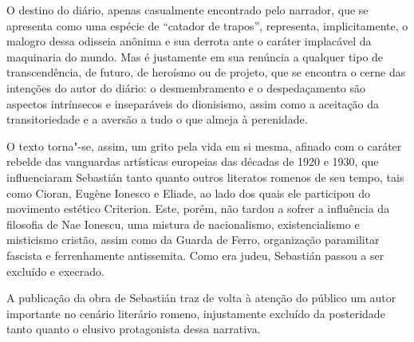 O destino do diário, apenas casualmente encontrado pelo narrador, que se
apresenta como uma espécie de ``catador de trapos'', representa,
implicitamente, o malogro dessa odisseia anônima e sua derrota ante o
caráter implacável da maquinaria do mundo. Mas é justamente em sua
renúncia a qualquer tipo de transcendência, de futuro, de heroísmo ou de
projeto, que se encontra o cerne das intenções do autor do diário: o
desmembramento e o despedaçamento são aspectos intrínsecos e
inseparáveis do dionisismo, assim como a aceitação da transitoriedade e
a aversão a tudo o que almeja à perenidade.

O texto torna"-se, assim, um grito pela vida em si mesma, afinado com o
caráter rebelde das vanguardas artísticas europeias das décadas de 1920
e 1930, que influenciaram Sebastián tanto quanto outros literatos
romenos de seu tempo, tais como Cioran, Eugène Ionesco e Eliade, ao lado dos
quais ele participou do movimento estético Criterion. Este, porém, não
tardou a sofrer a influência da filosofia de Nae Ionescu, uma mistura de
nacionalismo, existencialismo e misticismo cristão, assim como da Guarda
de Ferro, organização paramilitar fascista e ferrenhamente antissemita.
Como era judeu, Sebastián passou a ser excluído e execrado.

A publicação da obra de Sebastián traz de volta à atenção do público um
autor importante no cenário literário romeno, injustamente excluído da
posteridade tanto quanto o elusivo protagonista dessa narrativa. \enlargethispage{\baselineskip}


\pagebreak
\blankpage

